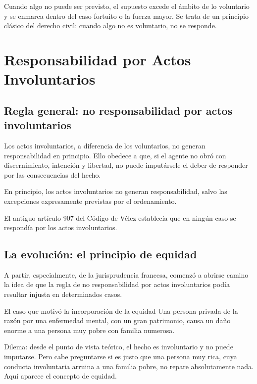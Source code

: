 \documentclass[12pt,oneside]{book}
\begin{document}
\begin{important}
Cuando algo no puede ser previsto, el supuesto excede el ámbito de lo voluntario y se enmarca dentro del caso fortuito o la fuerza mayor. Se trata de un principio clásico del derecho civil: cuando algo no es voluntario, no se responde.
\end{important}

\chapter{Responsabilidad por Actos Involuntarios}

\section{Regla general: no responsabilidad por actos involuntarios}

Los actos involuntarios, a diferencia de los voluntarios, no generan responsabilidad en principio. Ello obedece a que, si el agente no obró con discernimiento, intención y libertad, no puede imputársele el deber de responder por las consecuencias del hecho.

\begin{important}
En principio, los actos involuntarios no generan responsabilidad, salvo las excepciones expresamente previstas por el ordenamiento.
\end{important}

El antiguo artículo 907 del Código de Vélez establecía que en ningún caso se respondía por los actos involuntarios.

\section{La evolución: el principio de equidad}

A partir, especialmente, de la jurisprudencia francesa, comenzó a abrirse camino la idea de que la regla de no responsabilidad por actos involuntarios podía resultar injusta en determinados casos.

\begin{example}{El caso que motivó la incorporación de la equidad}
Una persona privada de la razón por una enfermedad mental, con un gran patrimonio, causa un daño enorme a una persona muy pobre con familia numerosa.

Dilema: desde el punto de vista teórico, el hecho es involuntario y no puede imputarse. Pero cabe preguntarse si es justo que una persona muy rica, cuya conducta involuntaria arruina a una familia pobre, no repare absolutamente nada. Aquí aparece el concepto de equidad.
\end{example}
\end{document}
